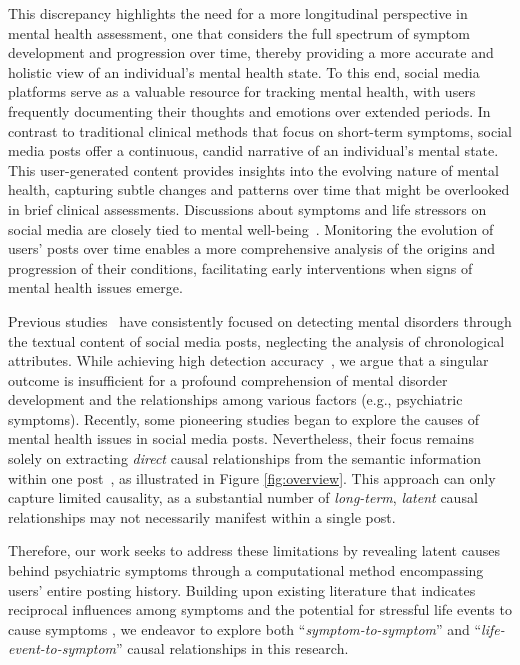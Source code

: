 This discrepancy highlights the need for a more longitudinal perspective in mental health assessment, one that considers the full spectrum of symptom development and progression over time, thereby providing a more accurate and holistic view of an individual’s mental health state.
To this end, social media platforms serve as a valuable resource for tracking mental health, 
with users frequently documenting their thoughts and emotions over extended periods. 
In contrast to traditional clinical methods that focus on short-term symptoms, 
social media posts offer a continuous, candid narrative of an individual's mental state. 
This user-generated content provides insights into the evolving nature of mental health, 
capturing subtle changes and patterns over time that might be overlooked in brief 
clinical assessments. 
Discussions about symptoms and life stressors on social media are closely tied to mental 
well-being~\cite{charles2013wear,harandi2017correlation}. 
Monitoring the evolution of users' posts over time enables a more comprehensive 
analysis of the origins and progression of their conditions, 
facilitating early interventions when signs of mental health issues emerge.

Previous studies~\cite{shen2017detecting,zhang2022psychiatric} have consistently focused on detecting mental disorders through the textual content of social media posts, neglecting the analysis of chronological attributes. While achieving high detection accuracy~\cite{chancellor2020methods, chen-etal-2023-detection}, we argue that a singular outcome is insufficient for a profound comprehension of mental disorder development and the relationships among various factors (e.g., psychiatric symptoms). Recently, some pioneering studies \cite{garg2022cams, Saxena2023Explainable} began to explore the causes of mental health issues in social media posts.  
Nevertheless, their focus remains solely on extracting \textit{direct} causal relationships from the semantic information within one post~\cite{luo2016commonsense}, as illustrated in Figure \ref{fig:overview}. This approach can only capture limited causality, as a substantial number of \textit{long-term}, \textit{latent} causal relationships may not necessarily manifest within a single post.

Therefore, our work seeks to address these limitations by revealing latent causes behind psychiatric symptoms through a computational method encompassing users' entire posting history. 
Building upon existing literature that indicates reciprocal influences among symptoms \cite{Gulistan2021Signal, Anish2023Mental} and the potential for stressful life events to cause symptoms \cite{Radell2021Abuse, Ruengorn2021Association}, we endeavor to explore both ``\textit{symptom-to-symptom}'' and ``\textit{life-event-to-symptom}'' causal relationships in this research. 

